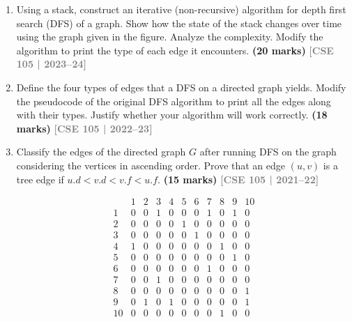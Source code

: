 \documentclass[12pt,a3paper]{article}
\newcommand{\yr}[1]{\hfill\textcolor{gray}{\small\textbf{[#1]}}}
\newcommand{\mk}[1]{\textcolor{orange!70!black}{\small\textbf{(#1 marks)}}}
\begin{document}
\begin{enumerate}
\item Using a stack, construct an iterative (non-recursive) algorithm for
depth first search (DFS) of a graph. Show how the state of the stack changes
over time using the graph given in the figure. Analyze the complexity. Modify
the algorithm to print the type of each edge it encounters. \mk{20}
\yr{CSE 105 | 2023--24}

\begin{center}
\end{center}

\item Define the four types of edges that a DFS on a directed graph yields.
Modify the pseudocode of the original DFS algorithm to print all the edges
along with their types. Justify whether your algorithm will work correctly.
\mk{18}
\yr{CSE 105 | 2022--23}

\item Classify the edges of the directed graph $G$ after running DFS on the
graph considering the vertices in ascending order. Prove that an edge $(u, v)$
is a tree edge if $u.d < v.d < v.f < u.f$. \mk{15}
\yr{CSE 105 | 2021--22}

\[
\begin{array}{c|cccccccccc}
  & 1 & 2 & 3 & 4 & 5 & 6 & 7 & 8 & 9 & 10 \\
\hline
1  & 0 & 0 & 1 & 0 & 0 & 0 & 1 & 0 & 1 & 0 \\
2  & 0 & 0 & 0 & 0 & 1 & 0 & 0 & 0 & 0 & 0 \\
3  & 0 & 0 & 0 & 0 & 0 & 1 & 0 & 0 & 0 & 0 \\
4  & 1 & 0 & 0 & 0 & 0 & 0 & 0 & 1 & 0 & 0 \\
5  & 0 & 0 & 0 & 0 & 0 & 0 & 0 & 0 & 1 & 0 \\
6  & 0 & 0 & 0 & 0 & 0 & 0 & 1 & 0 & 0 & 0 \\
7  & 0 & 0 & 1 & 0 & 0 & 0 & 0 & 0 & 0 & 0 \\
8  & 0 & 0 & 0 & 0 & 0 & 0 & 0 & 0 & 0 & 1 \\
9  & 0 & 1 & 0 & 1 & 0 & 0 & 0 & 0 & 0 & 1 \\
10 & 0 & 0 & 0 & 0 & 0 & 0 & 0 & 1 & 0 & 0 \\
\end{array}
\]


\end{enumerate}
\end{document}
